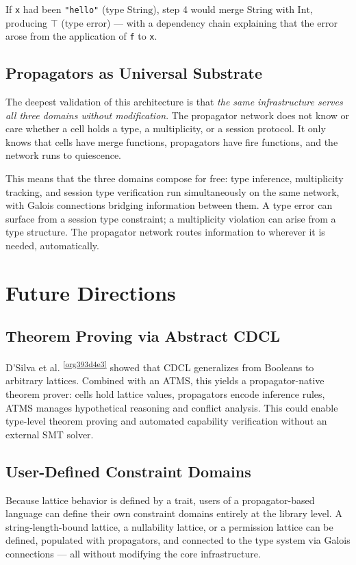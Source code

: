 \documentclass[11pt]{article}
\begin{document}
If \texttt{x} had been \texttt{"hello"} (type \(\text{String}\)), step 4 would merge
\(\text{String}\) with \(\text{Int}\), producing \(\top\) (type error) ---
with a dependency chain explaining that the error arose from the
application of \texttt{f} to \texttt{x}.
\subsection{Propagators as Universal Substrate}
\label{sec:org1cb94ce}

The deepest validation of this architecture is that \emph{the same
infrastructure serves all three domains without modification}. The
propagator network does not know or care whether a cell holds a type, a
multiplicity, or a session protocol. It only knows that cells have merge
functions, propagators have fire functions, and the network runs to
quiescence.

This means that the three domains compose for free: type inference,
multiplicity tracking, and session type verification run simultaneously
on the same network, with Galois connections bridging information
between them. A type error can surface from a session type constraint;
a multiplicity violation can arise from a type structure. The
propagator network routes information to wherever it is needed,
automatically.
\section{Future Directions}
\label{sec:org56f8ccf}

\subsection{Theorem Proving via Abstract CDCL}
\label{sec:org822417e}

D'Silva et al. \textsuperscript{\ref{org393d4e3}} showed that CDCL generalizes from Booleans to
arbitrary lattices. Combined with an ATMS, this yields a
propagator-native theorem prover: cells hold lattice values, propagators
encode inference rules, ATMS manages hypothetical reasoning and conflict
analysis. This could enable type-level theorem proving and automated
capability verification without an external SMT solver.
\subsection{User-Defined Constraint Domains}
\label{sec:org512d634}

Because lattice behavior is defined by a trait, users of a
propagator-based language can define their own constraint domains
entirely at the library level. A string-length-bound lattice, a
nullability lattice, or a permission lattice can be defined, populated
with propagators, and connected to the type system via Galois
connections --- all without modifying the core infrastructure.
\end{document}
